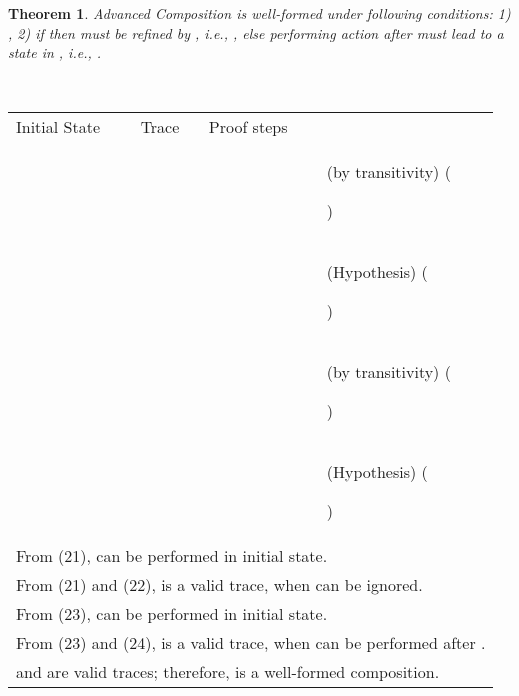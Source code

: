 \documentclass[12pt,journal,letterpaper,onecolumn]{IEEEtran}
\newcounter{myCounter}
\renewcommand{\themyCounter}{\arabic{myCounter}\addtocounter{myCounter}{1}}
\newtheorem{theorem}{Theorem}[section]
\begin{document}
\begin{theorem}
Advanced Composition  is well-formed
under following conditions: 1) , 2) if
 then  must be refined
by , i.e., , else performing action
 after  must lead to a state in , i.e., . \label{theorem:advancedseq} \end{theorem}
\\
\begin{minipage}{6in} \begin{center}
\begin{tabular}{llp{7.5cm}p{3.8cm}}
Initial State & Trace &  Proof steps & \\
 &  &   & (by transitivity) \hfill(\themyCounter) \\
& &    & (Hypothesis) \hfill(\themyCounter)\\
&  &    & (by transitivity) \hfill(\themyCounter)\\
& &   & (Hypothesis) \hfill(\themyCounter)\\
\multicolumn{4}{l}{From (21),  can be performed in initial state.}\\
\multicolumn{4}{l}{From (21) and (22),  is a valid trace, when  can be ignored.}\\
\multicolumn{4}{l}{From (23),  can be performed in initial state.}\\
\multicolumn{4}{l}{From (23) and (24),  is a valid trace, when  can be performed after . }\\
\multicolumn{4}{l}{ and  are valid traces; therefore,
 is a well-formed composition.}
\hfill
\end{tabular}
\end{center}
\end{minipage}\\
\end{document}
